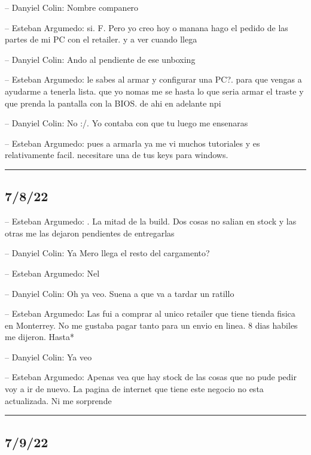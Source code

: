 -- Danyiel Colin: Nombre companero

-- Esteban Argumedo: si. F. Pero yo creo hoy o manana hago el pedido de
las partes de mi PC con el retailer. y a ver cuando llega

-- Danyiel Colin: Ando al pendiente de ese unboxing

-- Esteban Argumedo: le sabes al armar y configurar una PC?. para que
vengas a ayudarme a tenerla lista. que yo nomas me se hasta lo que seria
armar el traste y que prenda la pantalla con la BIOS. de ahi en adelante
npi

-- Danyiel Colin: No :/. Yo contaba con que tu luego me ensenaras

-- Esteban Argumedo: pues a armarla ya me vi muchos tutoriales y es
relativamente facil. necesitare una de tus keys para windows.

\begin{center}\rule{0.5\linewidth}{0.5pt}\end{center}

\hypertarget{section-120}{%
\subsection{7/8/22}\label{section-120}}

-- Esteban Argumedo: . La mitad de la build. Dos cosas no salian en
stock y las otras me las dejaron pendientes de entregarlas

-- Danyiel Colin: Ya Mero llega el resto del cargamento?

-- Esteban Argumedo: Nel

-- Danyiel Colin: Oh ya veo. Suena a que va a tardar un ratillo

-- Esteban Argumedo: Las fui a comprar al unico retailer que tiene
tienda fisica en Monterrey. No me gustaba pagar tanto para un envio en
linea. 8 dias habiles me dijeron. Hasta*

-- Danyiel Colin: Ya veo

-- Esteban Argumedo: Apenas vea que hay stock de las cosas que no pude
pedir voy a ir de nuevo. La pagina de internet que tiene este negocio no
esta actualizada. Ni me sorprende

\begin{center}\rule{0.5\linewidth}{0.5pt}\end{center}

\hypertarget{section-121}{%
\subsection{7/9/22}\label{section-121}}

